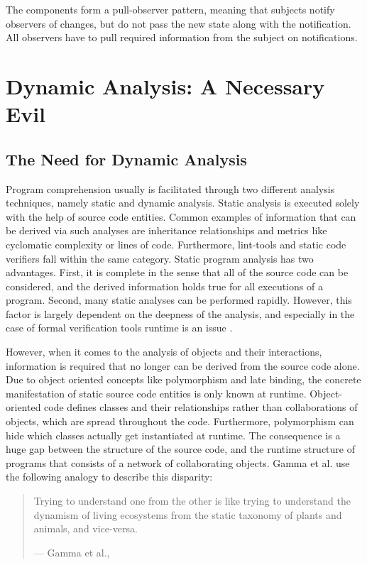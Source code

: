 The components form a pull-observer pattern, meaning that subjects notify observers of changes, but do not pass the new state along with the notification.
All observers have to pull required information from the subject on notifications. 

\section{Dynamic Analysis: A Necessary Evil}
\label{s:BackgroundAnalysis}

\subsection{The Need for Dynamic Analysis}
Program comprehension usually is facilitated through two different analysis techniques, namely static and dynamic analysis.
Static analysis is executed solely with the help of source code entities.
Common examples of information that can be derived via such analyses are inheritance relationships and metrics like cyclomatic complexity or lines of code.
Furthermore, lint-tools and static code verifiers fall within the same category.
Static program analysis has two advantages.
First, it is complete in the sense that all of the source code can be considered, and the derived information holds true for all executions of a program.
Second, many static analyses can be performed rapidly.
However, this factor is largely dependent on the deepness of the analysis, and especially in the case of formal verification tools runtime is an issue \cite{wichmann_industrial_1995}.

However, when it comes to the analysis of objects and their interactions, information is required that no longer can be derived from the source code alone.
Due to object oriented concepts like polymorphism and late binding, the concrete manifestation of static source code entities is only known at runtime.
Object-oriented code defines classes and their relationships rather than collaborations of objects, which are spread throughout the code.
Furthermore, polymorphism can hide which classes actually get instantiated at runtime.
The consequence is a huge gap between the structure of the source code, and the runtime structure of programs that consists of a network of collaborating objects.
Gamma et al. use the following analogy to describe this disparity:

\begin{quote}
Trying to understand one from the other is like trying to understand the dynamism of living ecosystems from the static taxonomy of plants and animals, and vice-versa.
\par\raggedleft--- \textup{Gamma et al.}, \cite{gamma_design_1995}
\end{quote}

